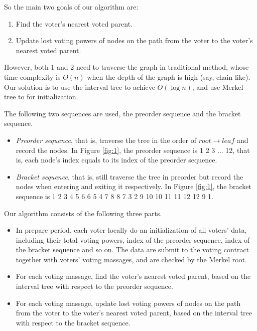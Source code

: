 So the main two goals of our algorithm are:
\begin{enumerate}
	\item Find the voter's nearest voted parent.
	\item Update lost voting powers of nodes on the path from the voter to the voter's nearest voted parent.
\end{enumerate}
However, both 1 and 2 need to traverse the graph in traditional method, whose time complexity is $O(n)$ when the depth of the graph is high (say, chain like). Our solution is to use the interval tree to achieve $O(\log n)$, and use Merkel tree to for initialization.

The following two sequences are used, the preorder sequence and the bracket sequence. 
\begin{itemize}
	\item {\em Preorder sequence}, that is, traverse the tree in the order of $root\rightarrow leaf$ and record the nodes. In Figure \ref{fig:1}, the preorder sequence is 1 2 3 ... 12, that is, each node's index equals to its index of the preorder sequence. 
	\item {\em Bracket sequence}, that is, still traverse the tree in preorder but record the nodes when entering and exiting it respectively.  In Figure \ref{fig:1}, the bracket sequence is 1 2 3 4 5 6 6 5 4 7 8 8 7 3 2 9 10 10 11 11 12 12 9 1.
\end{itemize} 

Our algorithm consists of the following three parts.
\begin{itemize}
	\item In prepare period, each voter locally do an initialization of all voters' data, including their total voting powers, index of the preorder sequence, index of the bracket sequence and so on. The data are submit to the voting contract together with voters' voting massages, and are checked by the Merkel root. 
	\item For each voting massage, find the voter's nearest voted parent, based on the interval tree with respect to the preorder sequence. 
	\item For each voting  massage, update lost voting powers of nodes on the path from the voter to the voter's nearest voted parent, based on the interval tree with respect to the bracket sequence. 
\end{itemize}
